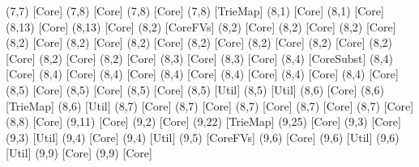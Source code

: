 {(7,7) [Core] %
(7,8) [Core] %
(7,8) [Core] %
(7,8) [TrieMap] %
(8,1) [Core] %
(8,1) [Core] %
(8,13) [Core] %
(8,13) [Core] %
(8,2) [CoreFVs] %
(8,2) [Core] %
(8,2) [Core] %
(8,2) [Core] %
(8,2) [Core] %
(8,2) [Core] %
(8,2) [Core] %
(8,2) [Core] %
(8,2) [Core] %
(8,2) [Core] %
(8,2) [Core] %
(8,2) [Core] %
(8,2) [Core] %
(8,3) [Core] %
(8,3) [Core] %
(8,4) [CoreSubst] %
(8,4) [Core] %
(8,4) [Core] %
(8,4) [Core] %
(8,4) [Core] %
(8,4) [Core] %
(8,4) [Core] %
(8,4) [Core] %
(8,5) [Core] %
(8,5) [Core] %
(8,5) [Core] %
(8,5) [Util] %
(8,5) [Util] %
(8,6) [Core] %
(8,6) [TrieMap] %
(8,6) [Util] %
(8,7) [Core] %
(8,7) [Core] %
(8,7) [Core] %
(8,7) [Core] %
(8,7) [Core] %
(8,8) [Core] %
(9,11) [Core] %
(9,2) [Core] %
(9,22) [TrieMap] %
(9,25) [Core] %
(9,3) [Core] %
(9,3) [Util] %
(9,4) [Core] %
(9,4) [Util] %
(9,5) [CoreFVs] %
(9,6) [Core] %
(9,6) [Util] %
(9,6) [Util] %
(9,9) [Core] %
(9,9) [Core] %
}
\newcommand{\provingcoordinates}{(91,41) [Exitify] %
}
\newcommand{\modsummarysymboliccoords}{symbolic y coords={CoreProofs.v,Core.v,Core.hs,VarSetProofs.v,VarSet.v,VarSet.hs,VarEnvProofs.v,VarEnv.v,VarEnv.hs,VarProofs.v,Var.v,Var.hs,UtilProofs.v,Util.v,Util.hs,UniqueProofs.v,Unique.v,Unique.hs,TrieMapProofs.v,TrieMap.v,TrieMap.hs,FVProofs.v,FV.v,FV.hs,ExitifyProofs.v,Exitify.v,Exitify.hs,CoreSubstProofs.v,CoreSubst.v,CoreSubst.hs,CoreFVsProofs.v,CoreFVs.v,CoreFVs.hs,CSEProofs.v,CSE.v,CSE.hs}}

